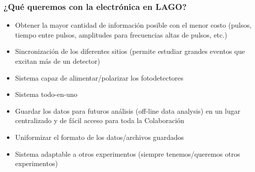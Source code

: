 \documentclass{beamer}
\begin{document}
\begin{frame}
				\frametitle{¿Qué queremos con la electrónica en LAGO?}
				\begin{block}{}
								\begin{itemize}
												\item Obtener la mayor cantidad de información
																posible con el menor costo (pulsos, tiempo
																entre pulsos, amplitudes para frecuencias
																altas de pulsos, etc.) 
																\pause
												\item Sincronización de los diferentes sitios (permite estudiar grandes
																eventos que excitan más de un detector)
																\pause
												\item Sistema capaz de alimentar/polarizar los fotodetectores
																\pause
												\item Sistema todo-en-uno
																\pause
												\item Guardar los datos para futuros análisis (off-line data analysis)
																en un lugar centralizado y de fácil acceso para toda la
																Colaboración
																\pause
												\item \alert{Uniformizar el formato de los datos/archivos
																guardados}
																\pause
												\item Sistema adaptable a otros experimentos (siempre tenemos/queremos
																otros experimentos)

								\end{itemize}
				\end{block}
\end{frame} 

\end{document}
